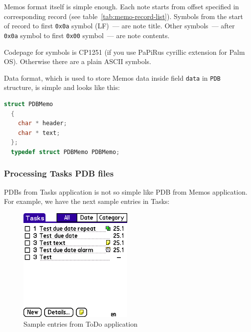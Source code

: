 \documentclass[a4paper,12pt,oneside]{scrartcl}
\begin{document}
Memos format itself is simple enough. Each note starts from offset specified in
corresponding record (see table~\ref{tab:memo-record-list}). Symbols from the
start of record to first \texttt{0x0a} symbol (LF)~--- are note title. Other
symbols~--- after \texttt{0x0a} symbol to first \texttt{0x00} symbol~--- are
note contents.

Codepage for symbols is CP1251 (if you use PaPiRus cyrillic extension for Palm
OS). Otherwise there are a plain ASCII symbols.

Data format, which is used to store Memos data inside field \texttt{data} in
\texttt{PDB} structure, is simple and looks like this:
\begin{lstlisting}[language=C, caption={C structure to store memo data}]
  struct PDBMemo
  {
	char * header;
	char * text;
  };
  typedef struct PDBMemo PDBMemo;
\end{lstlisting}

\subsubsection{Processing Tasks PDB files}
\label{sec:processing-todo-pdb}

PDBs from Tasks application is not so simple like PDB from Memos
application. For example, we have the next sample entries in Tasks:

\begin{figure}[H]
  \centering
  \includegraphics[width=0.5\textwidth]{tasks.png}
  \caption{Sample entries from ToDo application}
  \label{fig:sample-todos}
\end{figure}
\end{document}
